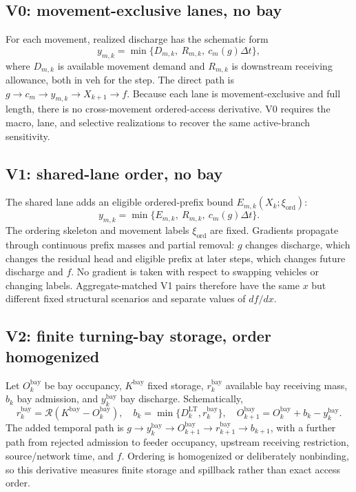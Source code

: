 \documentclass[10pt]{article}
\newcommand{\veh}{\mathrm{veh}}
\begin{document}
\subsection*{V0: movement-exclusive lanes, no bay}
For each movement, realized discharge has the schematic form
\[
  y_{m,k}=\min\{D_{m,k},\ R_{m,k},\ c_m(g)\Delta t\},
\]
where $D_{m,k}$ is available movement demand and $R_{m,k}$ is downstream receiving allowance, both in $\veh$ for the step. The direct path is $g\to c_m\to y_{m,k}\to X_{k+1}\to f$. Because each lane is movement-exclusive and full length, there is no cross-movement ordered-access derivative. V0 requires the macro, lane, and selective realizations to recover the same active-branch sensitivity.

\subsection*{V1: shared-lane order, no bay}
The shared lane adds an eligible ordered-prefix bound $E_{m,k}(X_k;\xi_{\mathrm{ord}})$:
\[
  y_{m,k}=\min\{E_{m,k},\ R_{m,k},\ c_m(g)\Delta t\}.
\]
The ordering skeleton and movement labels $\xi_{\mathrm{ord}}$ are fixed. Gradients propagate through continuous prefix masses and partial removal: $g$ changes discharge, which changes the residual head and eligible prefix at later steps, which changes future discharge and $f$. No gradient is taken with respect to swapping vehicles or changing labels. Aggregate-matched V1 pairs therefore have the same $x$ but different fixed structural scenarios and separate values of $df/dx$.

\subsection*{V2: finite turning-bay storage, order homogenized}
Let $O_k^{\mathrm{bay}}$ be bay occupancy, $K^{\mathrm{bay}}$ fixed storage, $r_k^{\mathrm{bay}}$ available bay receiving mass, $b_k$ bay admission, and $y_k^{\mathrm{bay}}$ bay discharge. Schematically,
\[
 r_k^{\mathrm{bay}}=\mathcal{R}(K^{\mathrm{bay}}-O_k^{\mathrm{bay}}),\quad
 b_k=\min\{D_k^{\mathrm{LT}},r_k^{\mathrm{bay}}\},\quad
 O_{k+1}^{\mathrm{bay}}=O_k^{\mathrm{bay}}+b_k-y_k^{\mathrm{bay}}.
\]
The added temporal path is $g\to y_k^{\mathrm{bay}}\to O_{k+1}^{\mathrm{bay}}\to r_{k+1}^{\mathrm{bay}}\to b_{k+1}$, with a further path from rejected admission to feeder occupancy, upstream receiving restriction, source/network time, and $f$. Ordering is homogenized or deliberately nonbinding, so this derivative measures finite storage and spillback rather than exact access order.
\end{document}
